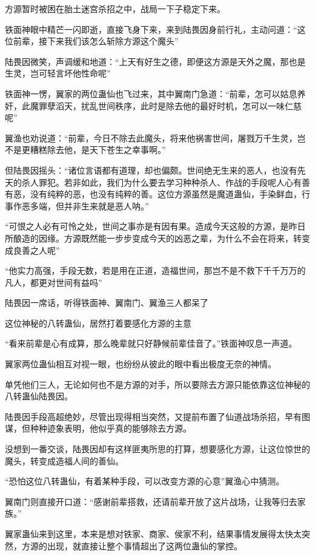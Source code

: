 
\begin{this_body}

方源暂时被困在胎土迷宫杀招之中，战局一下子稳定下来。

铁面神眼中精芒一闪即逝，直接飞身下来，来到陆畏因身前行礼，主动问道：“这位前辈，接下来我们该怎么斩除方源这个魔头”

陆畏因微笑，声调缓和地道：“上天有好生之德，即便这方源是天外之魔，那也是生灵，岂可轻言坏他性命呢”

铁面神一愣，翼家的两位蛊仙也飞过来，其中翼南门急道：“前辈，怎可以姑息养奸，此魔罪孽滔天，扰乱世间秩序，此时是除去他的最好时机，怎可以一味仁慈呢”

翼渔也劝说道：“前辈，今日不除去此魔头，将来他祸害世间，屠戮万千生灵，岂不是更糟糕除去他，是天下苍生之幸事啊。”

但陆畏因摇头：“诸位言语都有道理，却也偏颇。世间绝无生来的恶人，也没有先天的杀人罪犯。若非如此，我们为什么要去学习种种杀人、作战的手段呢人心有善有恶，没有纯粹的恶，也没有纯粹的善。这位方源虽然是魔道蛊仙，手染鲜血，行事作恶多端，但并非生来就是恶人呐。”

“可恨之人必有可怜之处，世间之事亦是有因有果。造成今天这般的方源，是昨日所酿造的因缘。方源既然能一步步变成今天的凶恶之辈，为什么不会在将来，转变成良善之人呢”

“他实力高强，手段无数，若是用在正道，造福世间，那岂不是不救下千千万万的凡人，都更对世间有益吗”

陆畏因一席话，听得铁面神、翼南门、翼渔三人都呆了

这位神秘的八转蛊仙，居然打着要感化方源的主意

“看来前辈是心有成算，那么晚辈就只好静候前辈佳音了。”铁面神叹息一声道。

翼家两位蛊仙相互对视一眼，也纷纷从彼此的眼中看出极度无奈的神情。

单凭他们三人，无论如何也不是方源的对手，所以要除去方源只能依靠这位神秘的八转蛊仙陆畏因。

陆畏因手段高超绝妙，尽管出现得相当突然，又提前布置了仙道战场杀招，早有图谋，但种种迹象表明，他似乎真的能够除去方源。

没想到一番交谈，陆畏因却有这样匪夷所思的打算，想要感化方源，让这位惊世的魔头，转变成造福人间的善仙。

“恐怕这位八转蛊仙，有着某种手段，可以改变方源的心意”翼渔心中猜测。

翼南门则直接开口道：“感谢前辈搭救，还请前辈开放了这片战场，让我等归去家族。”

翼家蛊仙来到这里，本来是想对铁家、商家、侯家不利，结果事情发展得太快太突然，方源的出现，就直接让整个事情超出了这两位蛊仙的掌控。


\end{this_body}
